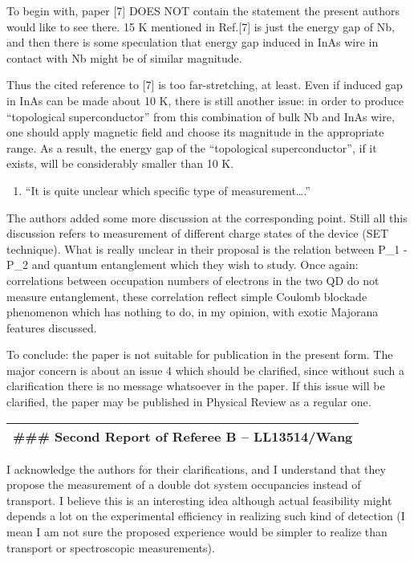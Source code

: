 \documentclass[11pt]{article}
\providecommand{\tightlist}{%
      \setlength{\itemsep}{0pt}\setlength{\parskip}{0pt}}
\begin{document}
To begin with, paper {[}7{]} DOES NOT contain the statement the present
authors would like to see there. 15 K mentioned in Ref.{[}7{]} is just
the energy gap of Nb, and then there is some speculation that energy gap
induced in InAs wire in contact with Nb might be of similar magnitude.

Thus the cited reference to {[}7{]} is too far-stretching, at least.
Even if induced gap in InAs can be made about 10 K, there is still
another issue: in order to produce ``topological superconductor'' from
this combination of bulk Nb and InAs wire, one should apply magnetic
field and choose its magnitude in the appropriate range. As a result,
the energy gap of the ``topological superconductor'', if it exists, will
be considerably smaller than 10 K.

\begin{enumerate}
\def\labelenumi{\arabic{enumi}.}
\setcounter{enumi}{3}
\tightlist
\item
  ``It is quite unclear which specific type of measurement\ldots{}.''
\end{enumerate}

The authors added some more discussion at the corresponding point. Still
all this discussion refers to measurement of different charge states of
the device (SET technique). What is really unclear in their proposal is
the relation between P\_1 - P\_2 and quantum entanglement which they
wish to study. Once again: correlations between occupation numbers of
electrons in the two QD do not measure entanglement, these correlation
reflect simple Coulomb blockade phenomenon which has nothing to do, in
my opinion, with exotic Majorana features discussed.

To conclude: the paper is not suitable for publication in the present
form. The major concern is about an issue 4 which should be clarified,
since without such a clarification there is no message whatsoever in the
paper. If this issue will be clarified, the paper may be published in
Physical Review as a regular one.

\begin{longtable}[]{@{}l@{}}
\toprule
\endhead
\#\#\# Second Report of Referee B -- LL13514/Wang\tabularnewline
\bottomrule
\end{longtable}

I acknowledge the authors for their clarifications, and I understand
that they propose the measurement of a double dot system occupancies
instead of transport. I believe this is an interesting idea although
actual feasibility might depends a lot on the experimental efficiency in
realizing such kind of detection (I mean I am not sure the proposed
experience would be simpler to realize than transport or spectroscopic
measurements).
\end{document}
